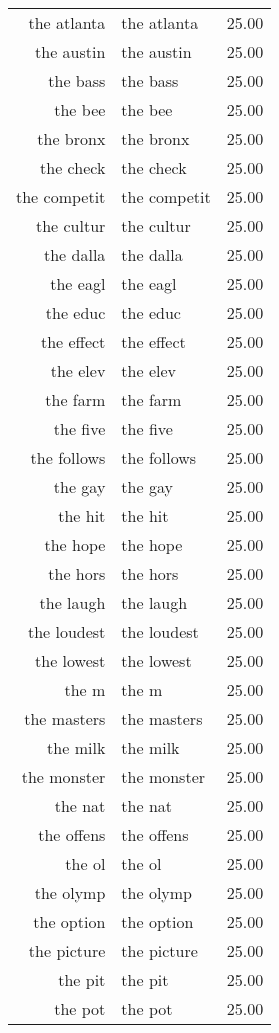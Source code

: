 \begin{table}[ht]
\begin{tabular}{rlr}
  the atlanta & the atlanta & 25.00 \\ 
  the austin & the austin & 25.00 \\ 
  the bass & the bass & 25.00 \\ 
  the bee & the bee & 25.00 \\ 
  the bronx & the bronx & 25.00 \\ 
  the check & the check & 25.00 \\ 
  the competit & the competit & 25.00 \\ 
  the cultur & the cultur & 25.00 \\ 
  the dalla & the dalla & 25.00 \\ 
  the eagl & the eagl & 25.00 \\ 
  the educ & the educ & 25.00 \\ 
  the effect & the effect & 25.00 \\ 
  the elev & the elev & 25.00 \\ 
  the farm & the farm & 25.00 \\ 
  the five & the five & 25.00 \\ 
  the follows & the follows & 25.00 \\ 
  the gay & the gay & 25.00 \\ 
  the hit & the hit & 25.00 \\ 
  the hope & the hope & 25.00 \\ 
  the hors & the hors & 25.00 \\ 
  the laugh & the laugh & 25.00 \\ 
  the loudest & the loudest & 25.00 \\ 
  the lowest & the lowest & 25.00 \\ 
  the m & the m & 25.00 \\ 
  the masters & the masters & 25.00 \\ 
  the milk & the milk & 25.00 \\ 
  the monster & the monster & 25.00 \\ 
  the nat & the nat & 25.00 \\ 
  the offens & the offens & 25.00 \\ 
  the ol & the ol & 25.00 \\ 
  the olymp & the olymp & 25.00 \\ 
  the option & the option & 25.00 \\ 
  the picture & the picture & 25.00 \\ 
  the pit & the pit & 25.00 \\ 
  the pot & the pot & 25.00 \\ 

\end{tabular}
\end{table}
